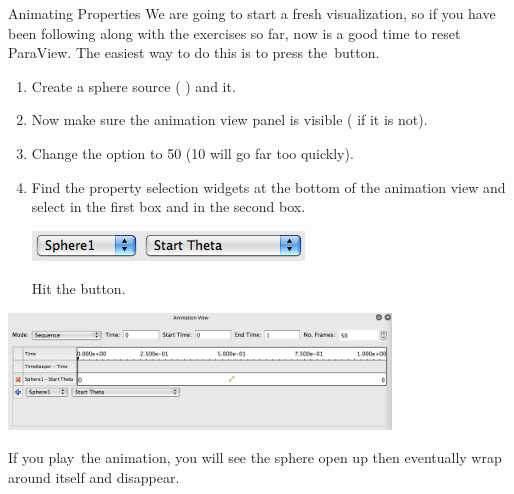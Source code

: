 \begin{exercise}{Animating Properties}
  \label{ex:AnimatingProperties}%
  We are going to start a fresh visualization, so if you have been
  following along with the exercises so far, now is a good time to reset
  ParaView.  The easiest way to do this is to press the~\disconnect button.

  \begin{enumerate}
  \item Create a sphere source ( \ra {}) and \apply it.
  \item Now make sure the animation view panel is visible ( \ra
     if it is not).
  \item Change the  option to 50 (10 will go far too quickly).
  \item Find the property selection widgets at the bottom of the animation
    view and select  in the first box and  in
    the second box.
    \begin{inlinefig}
      \includegraphics[height=1.5\baselineskip]{images/AddStartThetaTrack}
    \end{inlinefig}
    Hit the  button.
  \end{enumerate}

  \begin{inlinefig}
    \includegraphics[width=4in]{images/BuildAnimation1}
  \end{inlinefig}

  If you play~\vcrPlay the animation, you will see the sphere open up then
  eventually wrap around itself and disappear.


\end{exercise}
